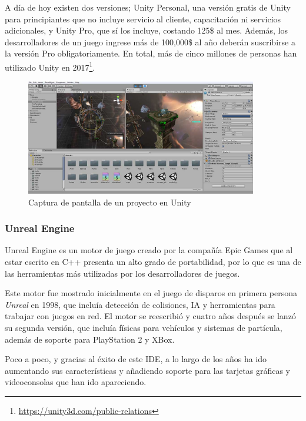 A día de hoy existen dos versiones; Unity Personal, una versión gratis de Unity para principiantes que no incluye servicio al cliente, capacitación ni servicios adicionales, y Unity Pro, que sí los incluye, costando 125\$ al mes. Además, los desarrolladores de un juego ingrese más de 100,000\$ al año deberán suscribirse a la versión Pro obligatoriamente. En total, más de cinco millones de personas han utilizado Unity en 2017\footnote{\url{https://unity3d.com/public-relations}}.

\begin{figure}[!h]
\begin{center}
\includegraphics[width=0.9\textwidth]{imagenes/2/unity.jpg}
\caption{Captura de pantalla de un proyecto en Unity}
\label{fig:unity}
\end{center}
\end{figure}


\subsubsection{Unreal Engine}

Unreal Engine es un motor de juego creado por la compañía Epic Games que al estar escrito en C++ presenta un alto grado de portabilidad, por lo que es una de las herramientas más utilizadas por los desarrolladores de juegos.

Este motor fue mostrado inicialmente en el juego de disparos en primera persona \textit{Unreal} en 1998, que incluía detección de colisiones, IA y herramientas para trabajar con juegos en red. El motor se reescribió y cuatro años después se lanzó su segunda versión, que incluía físicas para vehículos y sistemas de partícula, además de soporte para PlayStation 2 y XBox.

Poco a poco, y gracias al éxito de este \acs{IDE}, a lo largo de los años ha ido aumentando sus características y añadiendo soporte para las tarjetas gráficas y videoconsolas que han ido apareciendo.

